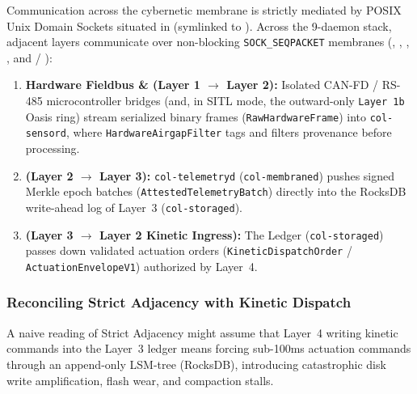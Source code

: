 Communication across the cybernetic membrane is strictly mediated by POSIX Unix Domain Sockets situated in  (symlinked to ). Across the 9-daemon stack, adjacent layers communicate over non-blocking \texttt{SOCK\_SEQPACKET} membranes (, , , , and  / ):
\begin{enumerate}
    \item \textbf{Hardware Fieldbus \&  (Layer 1 $\to$ Layer 2):} Isolated CAN-FD / RS-485 microcontroller bridges (and, in SITL mode, the outward-only \texttt{Layer 1b} Oasis ring) stream serialized binary frames (\texttt{RawHardwareFrame}) into \texttt{col-sensord}, where \texttt{HardwareAirgapFilter} tags and filters provenance before processing.
    \item \textbf{ (Layer 2 $\to$ Layer 3):} \texttt{col-telemetryd} (\texttt{col-membraned}) pushes signed Merkle epoch batches (\texttt{AttestedTelemetryBatch}) directly into the RocksDB write-ahead log of Layer~3 (\texttt{col-storaged}).
    \item \textbf{ (Layer 3 $\to$ Layer 2 Kinetic Ingress):} The Ledger (\texttt{col-storaged}) passes down validated actuation orders (\texttt{KineticDispatchOrder} / \texttt{ActuationEnvelopeV1}) authorized by Layer~4.
\end{enumerate}

\subsubsection{Reconciling Strict Adjacency with Kinetic Dispatch}
A naive reading of Strict Adjacency might assume that Layer~4 writing kinetic commands into the Layer~3 ledger means forcing sub-100ms actuation commands through an append-only LSM-tree (RocksDB), introducing catastrophic disk write amplification, flash wear, and compaction stalls.


